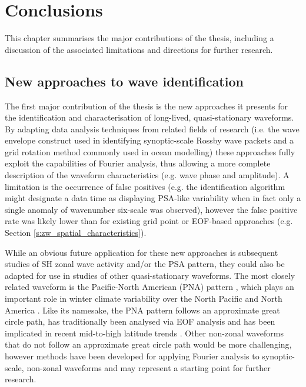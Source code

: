 
\chapter{Conclusions}\label{c:conclusions}


\begin{synopsis}
This chapter summarises the major contributions of the thesis, including a discussion of the associated limitations and directions for further research.
\end{synopsis}


\section{New approaches to wave identification}

The first major contribution of the thesis is the new approaches it presents for the identification and characterisation of long-lived, quasi-stationary waveforms. By adapting data analysis techniques from related fields of research (i.e. the wave envelope construct used in identifying synoptic-scale Rossby wave packets and a grid rotation method commonly used in ocean modelling) these approaches fully exploit the capabilities of Fourier analysis, thus allowing a more complete description of the waveform characteristics (e.g. wave phase and amplitude). A limitation is the occurrence of false positives (e.g. the identification algorithm might designate a data time as displaying PSA-like variability when in fact only a single anomaly of wavenumber six-scale was observed), however the false positive rate was likely lower than for existing grid point or EOF-based approaches (e.g. Section \ref{s:zw_spatial_characteristics}).

While an obvious future application for these new approaches is subsequent studies of SH zonal wave activity and/or the PSA pattern, they could also be adapted for use in studies of other quasi-stationary waveforms. The most closely related waveform is the Pacific-North American (PNA) pattern \citep{Wallace1981}, which plays an important role in winter climate variability over the North Pacific and North America \citep[e.g.][]{Notaro2006}. Like its namesake, the PNA pattern follows an approximate great circle path, has traditionally been analysed via EOF analysis and has been implicated in recent mid-to-high latitude trends \citep[e.g.][]{Ding2014,Liu2015}. Other non-zonal waveforms that do not follow an approximate great circle path would be more challenging, however methods have been developed for applying Fourier analysis to synoptic-scale, non-zonal waveforms \citep{Zimin2006,Souders2014} and may represent a starting point for further research. 

